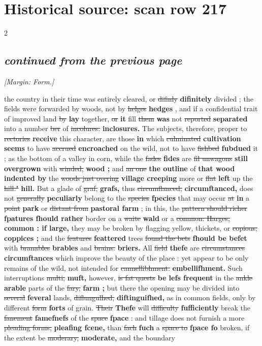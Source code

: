 \documentclass[10pt]{article}
\begin{document}
\section*{Historical source: scan row 217}
\begin{multicols}{2}
\subsection*{\textit{continued from the previous page}}
{\small\itshape [Margin: Form.]}\par
the country in their time was entirely cleared, or \sout{difinly} \textbf{difinitely} divided ; the fields were forwarded by woods, not by \sout{helges} \textbf{hedges} , and if a confidential trait of improved land \sout{by} \textbf{lay} together, \sout{or} \textbf{it} fill \sout{them} \textbf{was} not \sout{reported} \textbf{separated} into a number \sout{ber} of \sout{incolures.} \textbf{inclosures.} The subjects, therefore, proper to \sout{rectories} \textbf{receive} this character, are those \textbf{in} which \sout{culminated} \textbf{cultivation seems} to have \sout{accrued} \textbf{encroached} on the wild, not to have \sout{fishbed} \textbf{fubdued} it ; as the bottom of a valley in corn, while the \sout{fades} \textbf{fides} are \sout{fil unwagons} \textbf{still overgrown} with \sout{winded,} \textbf{wood ;} and \sout{an one} \textbf{the outline} of \textbf{that wood indented by} the \sout{woods just overing} \textbf{village creeping} more or \sout{flat} \textbf{left} up the \sout{hill."} \textbf{hill.} But a glade of \sout{graf,} \textbf{grafs,} thus \sout{circumflanced,} \textbf{circumftanced,} does not \sout{generally} \textbf{peculiarly} belong to the \sout{species} \textbf{fpecies} that may occur \sout{at} \textbf{in} a \sout{point} \textbf{park} or \sout{distant from} \textbf{pastoral farm} ; in this, the \sout{pattern should richer} \textbf{fpatures fhould rather} border on a \sout{waite} \textbf{wald} or a \sout{common: Harges,} \textbf{common : if large,} they may be broken by flagging yellow, thickets, or \sout{copious;} \textbf{coppices ;} and the \sout{features} \textbf{feattered} trees \sout{found the bets} \textbf{fhould be befet} with \sout{branables} \textbf{brables} and \sout{brains.} \textbf{briers.} All \sout{field} \textbf{thefe} are \sout{circumstances} \textbf{circumftances} which improve the beauty of the place : yet appear to be only remains of the wild, not intended for \sout{cannellibhment.} \textbf{embellifhment.} Such interruptions \sout{multi,} \textbf{muft,} however, \sout{is fat quests} \textbf{be lefs frequent} in the \sout{ankle} \textbf{arable} parts of the \sout{fary,} \textbf{farm ;} but there the opening may be divided into \sout{several} \textbf{feveral} lands, \sout{diflungulhed,} \textbf{diftinguifhed,} as in common fields, only by different \sout{form} \textbf{forts} of grain. \sout{Their} \textbf{Thefe} will \sout{difficulty} \textbf{fufficiently} break the \sout{fanement} \textbf{famefnefs} of the \sout{space} \textbf{fpace} : and tillage does not furnish a more \sout{pleading forms,} \textbf{pleafing fcene,} than \sout{fach} \textbf{fuch} a \sout{space to} \textbf{fpace fo} broken, if the extent be \sout{moderary,} \textbf{moderate,} and the boundary 
\end{multicols}
\end{document}
